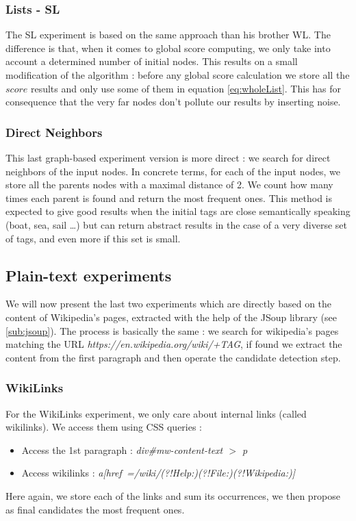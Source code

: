 \subsubsection{Lists - SL} %
\label{ssub:lists_sl}
The SL experiment is based on the same approach than his brother WL. The difference is that, when it comes to global score computing, we only take into account a determined number of initial nodes. This results on a small modification of the algorithm : before any global score calculation we store all the $score$ results and only use some of them in equation \eqref{eq:wholeList}. This has for consequence that the very far nodes don't pollute our results by inserting noise. 
\subsubsection{Direct Neighbors} %
\label{ssub:direct_neighbors}
This last graph-based experiment version is more direct : we search for direct neighbors of the input nodes. In concrete terms, for each of the input nodes, we store all the parents nodes with a maximal distance of 2. We count how many times each parent is found and return the most frequent ones. This method is expected to give good results when the initial tags are close semantically speaking (boat, sea, sail \dots) but can return abstract results in the case of a very diverse set of tags, and even more if this set is small.
\subsection{Plain-text experiments} %
\label{sub:plain_text_experiments}
We will now present the last two experiments which are directly based on the content of Wikipedia's pages, extracted with the help of the JSoup library (see \ref{sub:jsoup}). The process is basically the same : we search for wikipedia's pages matching the URL \emph{https://en.wikipedia.org/wiki/+TAG}, if found we extract the content from the first paragraph and then operate the candidate detection step.
\subsubsection{WikiLinks} %
\label{ssub:wikilinks}
For the WikiLinks experiment, we only care about internal links (called wikilinks). We access them using CSS queries :
\begin{itemize}
	\item Access the 1st paragraph : \emph{div\#mw-content-text $>$ p}
	\item Access wikilinks : \emph{a[href~=/wiki/(?!Help:)(?!File:)(?!Wikipedia:)]}
\end{itemize}
Here again, we store each of the links and sum its occurrences, we then propose as final candidates the most frequent ones.
